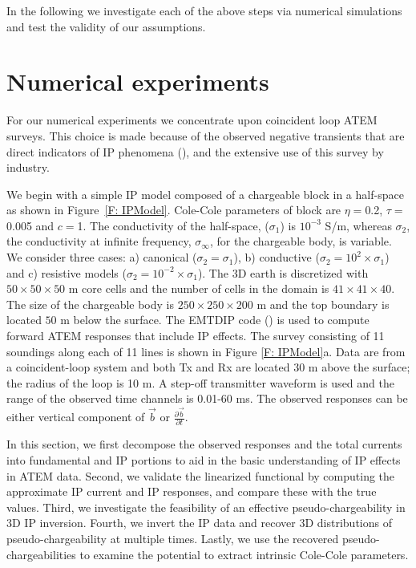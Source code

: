 \documentclass[extra,mreferee]{gji}
\newcommand{\siginf}{\sigma_\infty}
\renewcommand {\b}  { {\vec b} }
\begin{document}
In the following we investigate each of the above steps via numerical simulations and test the validity of our assumptions. 


\section{Numerical experiments}
\label{section: numerical_examples}
For our numerical experiments we concentrate upon coincident loop ATEM surveys. This choice is made because of the observed negative transients that are direct indicators of IP phenomena (\cite{Kratzer2012,Kang2015a,Kang2015b,Doug2015}), and the extensive  use of this survey  by industry.  

We begin with a simple IP model composed of  a chargeable block in a half-space as shown in Figure~\ref{F: IPModel}.
Cole-Cole parameters of block are  $\eta=$0.2, $\tau=$0.005 and $c=$1.
The conductivity  of the half-space, ($\sigma_1$) is  $10^{-3}$ S/m, whereas $\sigma_2$, 
the conductivity at infinite frequency, $\siginf$,  for the chargeable body, is variable.  
We consider three cases: a) canonical ($\sigma_2=\sigma_1$), b) conductive ($\sigma_2=10^2\times\sigma_1$) and c) resistive models ($\sigma_2=10^{-2}\times\sigma_1$).
The 3D earth is discretized with  $50\times50\times50$ m core cells and the number of cells in the domain is $41\times41\times40$.
The size of the chargeable body is $250\times250\times200$ m and the top boundary is located  $50$ m below the surface.
The EMTDIP code (\cite{Marchant2014}) is used to compute forward ATEM responses that include IP effects. The survey consisting of 11 soundings along each of 11 lines is shown in Figure \ref{F: IPModel}a.
Data are from a  coincident-loop system and both Tx and Rx are located 30 m above the surface; the radius of the loop is 10 m.
A step-off transmitter waveform is used and the range of the observed time channels is 0.01-60 ms. The observed responses can be either vertical component of $\b$ or $\frac{\partial \b}{\partial t}$.

In this section, we first decompose the observed responses and the total currents into fundamental and IP portions to aid in the basic understanding of IP effects in ATEM data. 
Second, we validate the linearized functional by computing the approximate IP current and IP responses, and compare these  with the true values. 
Third, we investigate the feasibility of an effective pseudo-chargeability in 3D IP inversion. 
Fourth, we invert the IP data and recover 3D distributions of pseudo-chargeability at multiple times.  Lastly, we use the recovered pseudo-chargeabilities to examine the potential to extract intrinsic Cole-Cole parameters. 
\end{document}
